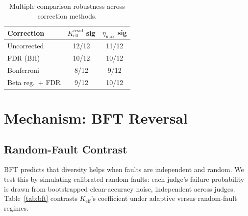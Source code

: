 \documentclass[11pt,a4paper]{article}
\newcommand{\keff}{K_{\text{eff}}}
\newcommand{\etamax}{\eta_{\text{max}}}
\newcommand{\keffresid}{K_{\text{eff}}^{\text{resid}}}
\begin{document}
\begin{table}[t]
\centering
\small
\caption{Multiple comparison robustness across correction methods.}
\label{tab:diagnostics}
\begin{tabular}{lcc}
\toprule
Correction & $\keffresid$ sig & $\etamax$ sig \\
\midrule
Uncorrected & 12/12 & 11/12 \\
FDR (BH) & 10/12 & 10/12 \\
Bonferroni & 8/12 & 9/12 \\
Beta reg.\ + FDR & 9/12 & 10/12 \\
\bottomrule
\end{tabular}
\end{table}

\section{Mechanism: BFT Reversal}

\subsection{Random-Fault Contrast}

BFT predicts that diversity helps when faults are independent and random. We test this by simulating calibrated random faults: each judge's failure probability is drawn from bootstrapped clean-accuracy noise, independent across judges. Table~\ref{tab:bft} contrasts $\keff$'s coefficient under adaptive versus random-fault regimes.
\end{document}
